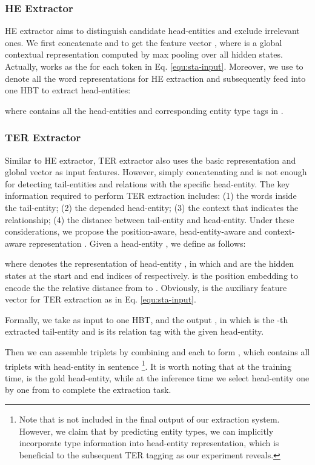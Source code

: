 \documentclass{ecai}
\begin{document}
\subsubsection{HE Extractor}
HE extractor aims to distinguish candidate head-entities and exclude irrelevant ones. We first concatenate  and  to get the feature vector , where  is a global contextual representation computed by max pooling over all hidden states. 
Actually,  works as the  for each token in Eq. \ref{equ:sta-input}.
Moreover, we use  to denote all the word representations for HE extraction and subsequently feed  into one HBT to extract head-entities:
 
\noindent where    contains all the head-entities and corresponding entity type tags in .

\subsubsection{TER Extractor} 

Similar to HE extractor, TER extractor also uses the basic representation  and global vector  as input features. 
However, simply concatenating  and  is not enough for detecting tail-entities and relations with the specific head-entity.
The key information required to perform TER extraction includes: 
(1) the words inside the tail-entity; 
(2) the depended head-entity; 
(3) the context that indicates the relationship; 
(4) the distance between tail-entity and head-entity. 
Under these considerations, we propose the position-aware, head-entity-aware and context-aware representation . 
Given a head-entity , we define  as follows:

where  denotes the representation of head-entity , in which  and   are the hidden states at the start and end indices of  respectively.
  is the position embedding to encode the the relative distance from  to . 
Obviously,    is the auxiliary feature vector for TER extraction as  in Eq. \ref{equ:sta-input}.


Formally, we take    as input to one HBT, and the output   , in which  is the -th extracted tail-entity and  is its relation tag with the given head-entity. 
 

Then we can assemble triplets by combining  and each  to form , which contains all triplets with head-entity  in sentence  \footnote{Note that  is not included in the final output of our extraction system. However, we claim that by predicting entity types, we can implicitly incorporate type information into head-entity representation, which is beneficial to the subsequent TER tagging as our experiment reveals.}.
It is worth noting that at the training time,  is the gold head-entity, while at the inference time we select head-entity one by one from  to complete the extraction task.
\end{document}
